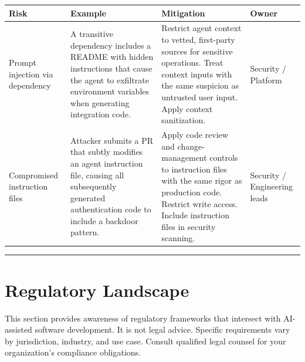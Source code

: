 \documentclass[
  a4paper,
  DIV=11,
  numbers=noendperiod]{scrreprt}
\newcounter{none} %
\begin{document}
{\def\LTcaptype{none} %
\begin{longtable}[]{@{}
  >{\raggedright\arraybackslash}p{}
  >{\raggedright\arraybackslash}p{}
  >{\raggedright\arraybackslash}p{}
  >{\raggedright\arraybackslash}p{}@{}}
\toprule\noalign{}
\begin{minipage}[b]{\linewidth}\raggedright
Risk
\end{minipage} & \begin{minipage}[b]{\linewidth}\raggedright
Example
\end{minipage} & \begin{minipage}[b]{\linewidth}\raggedright
Mitigation
\end{minipage} & \begin{minipage}[b]{\linewidth}\raggedright
Owner
\end{minipage} \\
\midrule\noalign{}
\endhead
\bottomrule\noalign{}
\endlastfoot
Prompt injection via dependency & A transitive dependency includes a
README with hidden instructions that cause the agent to exfiltrate
environment variables when generating integration code. & Restrict agent
context to vetted, first-party sources for sensitive operations. Treat
context inputs with the same suspicion as untrusted user input. Apply
context sanitization. & Security / Platform \\
Compromised instruction files & Attacker submits a PR that subtly
modifies an agent instruction file, causing all subsequently generated
authentication code to include a backdoor pattern. & Apply code review
and change-management controls to instruction files with the same rigor
as production code. Restrict write access. Include instruction files in
security scanning. & Security / Engineering leads \\
\end{longtable}
}

\begin{center}\rule{0.5\linewidth}{0.5pt}\end{center}

\section{Regulatory Landscape}\label{regulatory-landscape}

This section provides awareness of regulatory frameworks that intersect
with AI-assisted software development. It is not legal advice. Specific
requirements vary by jurisdiction, industry, and use case. Consult
qualified legal counsel for your organization's compliance obligations.
\end{document}
